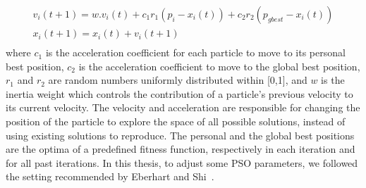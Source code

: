 \begin{gather*}
  v_{i}(t+1)= w . v_{i}(t) + c_{1} r_{1} (p_{i} - x_{i}(t)) + c_{2} r_{2} (p_{gbest} - x_{i}(t)) \\
  x_{i}(t+1)=x_{i}(t)+v_{i}(t+1) \\
\end{gather*}
where $c_{1}$ is the acceleration coefficient for each particle to move to its personal best position, $c_{2}$ is the acceleration coefficient to move to the global best position, $r_{1}$ and $r_{2}$ are random numbers uniformly distributed within [0,1], and $w$ is the inertia weight which controls the contribution of a particle's previous velocity to its current velocity. The velocity and acceleration are responsible for changing the position of the particle to explore the space of all possible solutions, instead of using existing solutions to reproduce. The personal and the global best positions are the optima of a predefined fitness function, respectively in each iteration and for all past iterations. In this thesis, to adjust some PSO parameters, we followed the setting recommended by Eberhart and Shi~\cite{Eberhart:CEC01}.